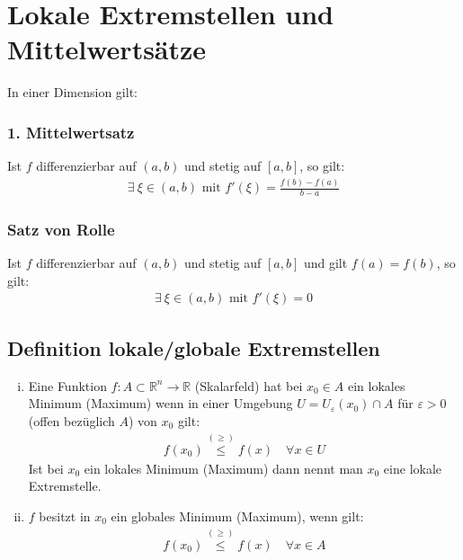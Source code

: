 \documentclass[11pt,a4paper]{book}
\newcommand {\R}	{\mathbb{R}}
\newcommand {\Rn}	{\mathbb{R}^n}
\newcommand{\1}    	{\mathbbm{1}}
\newcommand{\mitt}	{\textrm{ mit }}
\begin{document}
\section{Lokale Extremstellen und Mittelwertsätze}

In einer Dimension gilt:
\subsubsection*{1. Mittelwertsatz}
Ist \(f\) differenzierbar auf \((a,b)\) und stetig auf \([a,b]\), so gilt:
\begin{align*}
	\exists~ \xi \in (a,b) \mitt f'(\xi) = \frac{f(b) - f(a)}{b - a}
\end{align*}

\subsubsection*{Satz von Rolle}
Ist \(f\) differenzierbar auf \((a,b)\) und stetig auf \([a,b]\) und gilt \(f(a) = f(b)\), so gilt:
\begin{align*}
	\exists~ \xi \in (a,b) \mitt f'(\xi) = 0
\end{align*}

\subsection{Definition lokale/globale Extremstellen}
\begin{enumerate}[(i)]
	\item Eine Funktion \(f: A \subset \Rn \rightarrow \R \) (Skalarfeld) hat bei \(x_0 \in A\) ein lokales Minimum (Maximum) wenn in einer Umgebung \(U = U_\varepsilon (x_0) \cap A\) für \( \varepsilon > 0\) (offen bezüglich \(A\)) von \(x_0\) gilt:
	\begin{align*}
		f(x_0) \stackrel{(\geqslant)}{\leqslant} f(x) \quad \forall x \in U
	\end{align*}	 
	Ist bei \(x_0\) ein lokales Minimum (Maximum) dann nennt man \(x_0\) eine lokale Extremstelle. 
	\item \(f\) besitzt in \(x_0\) ein globales Minimum (Maximum), wenn gilt:
	\begin{align*}
		f(x_0) \stackrel{(\geqslant)}{\leqslant} f(x) \quad \forall x \in A
	\end{align*}
\end{enumerate}
\end{document}
